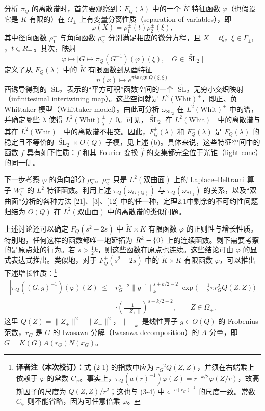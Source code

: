 分析 $\pi_Q$ 的离散谱时，首先要观察到：$F_Q(\lambda)$ 中的一个 $\widetilde K$ 特征函数 $\varphi$（也假设它是 $K$ 有限的）在 $\Omega_\pm$ 上有变量分离性质（separation of variables），即
\[
 \varphi(X)=\rho_1^\pm(t)\rho_2^\pm(\xi),
\]
其中径向函数 $\rho_1^\pm$ 与角向函数 $\rho_2^\pm$ 分别满足相应的微分方程，且 $X=t\xi$，$\xi\in\Gamma_{\pm1}$，$t\in R_+$。其次，映射
\[
 \varphi\longmapsto\bigl[G\longmapsto\pi_Q(G^{-1})(\varphi)(\xi),
 \quad G\in\widetilde{\operatorname{SL}}_2\bigr]
\]
定义了从 $F_Q(\lambda)$ 中的 $\widetilde K$ 有限函数到从酉特征
\[
 n(x)\longmapsto e^{\pi ix\operatorname{sgn}Q(\xi,\xi)}
\]
酉诱导得到的 $\widetilde{\operatorname{SL}}_2$ 表示的“平方可积”函数空间的一个 $\widetilde{\operatorname{SL}}_2$ 无穷小交织映射（infinitesimal intertwining map）。这些空间就是 $L^2(\mathrm{Whit})^\pm$，即正、负 Whittaker 模型（Whittaker model）。由此可分析 $\omega_{\operatorname{SL}_2}$ 在 $L^2(\mathrm{Whit})^\pm$ 中的谱，并确定哪些 $\lambda$ 使得 $L^2(\mathrm{Whit})_\lambda^\pm\ne0$。可见，$\widetilde{\operatorname{SL}}_2$ 在 $L^2(\mathrm{Whit})^+$ 中的离散谱与其在 $L^2(\mathrm{Whit})^-$ 中的离散谱不相交。因此，$F_Q^+(\lambda)$ 和 $F_Q^-(\lambda)$ 是 $F_Q(\lambda)$ 的稳定且不等价的 $\widetilde{\operatorname{SL}}_2\times O(Q)$ 子模，见上述 (b)。具体来说，这些特征空间中的函数 $f$ 具有如下性质：$f$ 和其 Fourier 变换 $\widehat f$ 的支集都完全位于光锥（light cone）的同一侧。

下一步考察 $\varphi$ 的角向部分 $\rho_2^\pm$。$\rho_2^\pm$ 只是 $L^2(\text{双曲面})$ 上的 Laplace--Beltrami 算子 $W_\xi^\pm$ 的 $L^2$ 特征函数。利用上述 $\pi_Q(\omega_{O(Q)})$ 与 $\pi_Q(\omega_{\operatorname{SL}_2})$ 的关系，以及“双曲面”分析的各种方法 [21]、[3]、[12] 中的任一种，定理2.1中剩余的不可约性问题归结为 $O(Q)$ 在 $L^2(\text{双曲面})$ 中的离散谱的类似问题。

上述讨论还可以确定 $F_Q(s^2-2s)$ 中 $\widetilde K\times K$ 有限函数 $\varphi$ 的正则性与增长性质。特别地，任何这样的函数都唯一地延拓为 $R^k-\{0\}$ 上的连续函数。剩下需要考察的是原点处的行为。若 $s>\tfrac12k$，则这些函数在原点也连续。这些结论可由 $\varphi$ 的显式表达式推出。类似地，对于 $F_Q^+(s^2-2s)$ 中的 $\widetilde K\times K$ 有限函数 $\varphi$，可以推出下述增长性质：\footnote{\textbf{译者注（本次校订）：}式 (2-1) 的指数中应为 $r_G^{-2}Q(Z,Z)$，并须在右端乘上依赖于 $\varphi$ 的常数 $C_\varphi$。事实上，$\pi_Q(a(r)^{-1})\varphi(Z)=r^{-k/2}\varphi(Z/r)$，故高斯因子的尺度为 $Q(Z,Z)/r^2$；这也与 (3-4) 中 $e^{-c(r_G)^{-2}}$ 的尺度一致。常数 $C_\varphi$ 则不能省略，因为可任意倍乘 $\varphi$。}
\begin{equation}
\begin{split}
 |\pi_Q((G,g)^{-1})(\varphi)(Z)|
 \le{}&r_G^{s-2}\|g^{-1}\|_k^{s+k/2-2}
 \exp\bigl(-\tfrac12\pi r_G^2Q(Z,Z)\bigr)\\
 &\cdot\left(\frac1{\|Z_+\|}\right)^{s+k/2-2},\qquad Z\in\Omega_+.
\end{split}\tag{2-1}
\end{equation}
这里 $Q(Z)=\|Z_+\|^2-\|Z_-\|^2$，$\|\ \|_k$ 是线性算子 $g\in O(Q)$ 的 Frobenius 范数，$r_G$ 是 $G$ 的 Iwasawa 分解（Iwasawa decomposition）的 $A$ 分量，即 $G=K(G)A(r_G)N(x_G)$。

